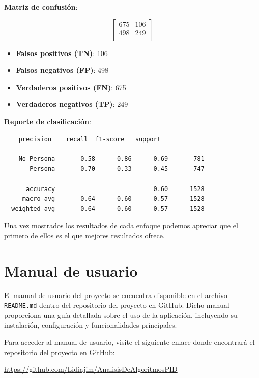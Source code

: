 \documentclass[a4paper]{article}
\begin{document}
\textbf{Matriz de confusión}:

\[
\begin{bmatrix}
    675 & 106 \\
    498 & 249 \\
\end{bmatrix}
\]

\begin{itemize}
    \item \textbf{Falsos positivos (TN)}: 106
    \item \textbf{Falsos negativos (FP)}: 498
    \item \textbf{Verdaderos positivos (FN)}: 675
    \item \textbf{Verdaderos negativos (TP)}: 249
\end{itemize}

\textbf{Reporte de clasificación}:

\begin{verbatim}
    precision    recall  f1-score   support

    No Persona       0.58      0.86      0.69       781
       Persona       0.70      0.33      0.45       747
  
      accuracy                           0.60      1528
     macro avg       0.64      0.60      0.57      1528
  weighted avg       0.64      0.60      0.57      1528
\end{verbatim}

Una vez mostrados los resultados de cada enfoque podemos apreciar que el primero de ellos es el que mejores resultados ofrece.


\newpage

\section{Manual de usuario}

El manual de usuario del proyecto se encuentra disponible en el archivo \texttt{README.md} dentro del repositorio del proyecto en GitHub. Dicho manual proporciona una guía detallada sobre el uso de la aplicación, incluyendo su instalación, configuración y funcionalidades principales.
\par\hspace{1cm}

Para acceder al manual de usuario, visite el siguiente enlace donde encontrará el repositorio del proyecto en GitHub:

\begin{center}
\url{https://github.com/Lidiajim/AnalisisDeAlgoritmosPID}
\end{center}
\newpage
\end{document}
